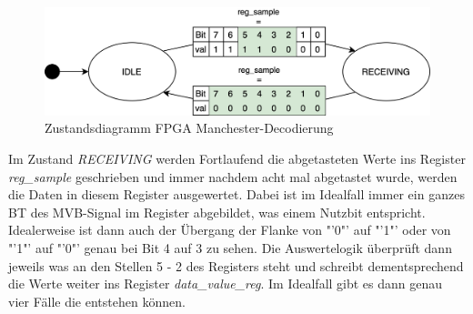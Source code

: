 \begin{figure}[H]
    \centering
    \includegraphics[width=0.7\linewidth]{Figures//Chap3//FPGA/FPGA_idle_rec.png}
    \caption{Zustandsdiagramm FPGA Manchester-Decodierung}
    \label{fig:FPGAIdleRec}
\end{figure}

Im Zustand \textit{RECEIVING} werden Fortlaufend die abgetasteten Werte ins Register 
\textit{reg\_sample} geschrieben und immer nachdem acht mal abgetastet wurde, werden die Daten in diesem Register ausgewertet. Dabei ist im Idealfall immer ein ganzes BT des MVB-Signal im Register abgebildet, was einem Nutzbit entspricht. Idealerweise ist dann auch der Übergang der Flanke von "'0"' auf "'1"' oder von "'1"' auf "'0"' genau bei Bit 4 auf 3 zu sehen. Die Auswertelogik überprüft dann jeweils was an den Stellen 5 - 2 des Registers steht und schreibt dementsprechend die Werte weiter ins Register \textit{data\_value\_reg}. Im Idealfall gibt es dann genau vier Fälle die entstehen können.







